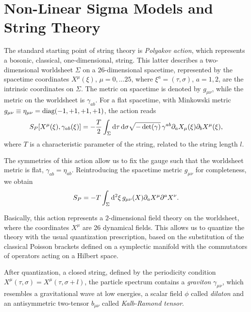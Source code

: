 \section{Non-Linear Sigma Models and String Theory}
The standard starting point of string theory is \emph{Polyakov action}, which represents a bosonic, classical, one-dimensional, string. This latter describes a two-dimensional worldsheet $\Sigma$ on a $26$-dimensional spacetime, represented by the spacetime coordinates $X^\mu(\xi)$, $\mu = 0, \dots 25$, where $\xi^a = (\tau, \sigma)$, $a = 1,2$, are the intrinsic coordinates on $\Sigma$. The metric on spacetime is denoted by $g_{\mu\nu}$, while the metric on the worldsheet is $\gamma_{ab}$. For a flat spacetime, with Minkowski metric $g_{\mu\nu} \equiv \eta_{\mu\nu} = \textup{diag}(-1,+1,+1,+1)$, the action reads
\begin{equation}\label{eq:polyakov}
    S_P [X^\mu(\xi), \gamma_{ab}(\xi)] = -\frac{T}{2} \int_\Sigma \mathop{}\!\mathrm{d} \tau \mathop{}\!\mathrm{d} \sigma \sqrt{-\det(\gamma)} \, \gamma^{ab} \partial_a X_\mu (\xi) \partial_b X^\mu (\xi),
\end{equation}
where $T$ is a characteristic parameter of the string, related to the string length $l$.

The symmetries of this action allow us to fix the gauge such that the worldsheet metric is flat, $\gamma_{ab} = \eta_{ab}$. Reintroducing the spacetime metric $g_{\mu\nu}$ for completeness, we obtain
\begin{equation}\label{eq:polyakov-metric}
    S_P = - T \int_\Sigma \mathop{}\!\mathrm{d}^2 \xi \, g_{\mu\nu}(X) \partial_a X^\mu \partial^a X^\nu.
\end{equation}

Basically, this action represents a $2$-dimensional field theory on the worldsheet, where the coordinates $X^\mu$ are 26 dynamical fields. This allows us to quantize the theory with the usual quantization prescription, based on the substitution of the classical Poisson brackets defined on a symplectic manifold with the commutators of operators acting on a Hilbert space.

After quantization, a closed string, defined by the periodicity condition $X^\mu(\tau,\sigma) = X^\mu (\tau, \sigma + l)$, the particle spectrum contains a \emph{graviton} $\gamma_{\mu\nu}$, which resembles a gravitational wave at low energies, a scalar field $\phi$ called \emph{dilaton} and an antisymmetric two-tensor $b_{\mu\nu}$ called \emph{Kalb-Ramond tensor}.

